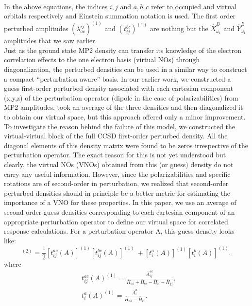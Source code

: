 \\
In the above equations, the indices $i,j$ and $a,b,c$ refer to occupied and virtual orbitals respectively
and Einstein summation notation is used. The first order perturbed amplitudes $(\lambda^{ij}_{ac})^{(1)}$ 
and $(t^{bc}_{ij})^{(1)}$ are nothing but the $\hat{X}^{B}_{\omega_1}$ and $\hat{Y}^{B}_{\omega_1}$ 
amplitudes that we saw earlier.\\ Just as the ground state MP2 density can transfer its knowledge of 
the electron correlation effects to the one electron basis (virtual NOs) through diagonalization, 
the perturbed densities can be used in a similar way to construct a compact ``perturbation aware''
basis. In our earlier work, we constructed a guess first-order perturbed density associated  
with each cartesian component (x,y,z) of the perturbation operator (dipole in the case of polarizabilities)
from MP2 amplitudes, took an average of the three densities and then diagonalized it to obtain our 
virtual space, but this approach offered only a minor improvement\cite{Kumar17}.
To investigate the reason behind the failure of this model, we constructed the virtual-virtual
block of the full CCSD first-order perturbed density. All the diagonal elements of this density 
matrix were found to be zeros irrespective of the perturbation operator. The exact reason for this
is not yet understood but clearly, the virtual NOs (VNOs) obtained from this (or guess) density 
do not carry any useful information. However, since the polarizabilities and specific rotations are 
of second-order in perturbation, we realized that second-order perturbed densities should in principle be a better 
metric for estimating the importance of a VNO for these properties.
In this paper, we use an average of second-order guess densities corresponding to each cartesian
component of an appropriate perturbation operator to define our virtual space 
for correlated response calculations. For a perturbation operator A, this guess density looks like:
\\
\begin{equation}
[{D^A_{ab}}]^{(2)} = \frac{1}{2}[t^{ac}_{ij}(A)]^{(1)}[t^{bc}_{ij}(A)]^{(1)} \
+ [t^{a}_{i}(A)]^{(1)} [t^{b}_{i}(A)]^{(1)}.
\end{equation}
where
\begin{equation}
\begin{split}
& t^{ac}_{ij}(A)^{(1)} = \frac{\bar{A}^{ac}_{ij}}{\overbar{H}_{aa} + \overbar{H}_{cc} - \overbar{H}_{ii} - \overbar{H}_{jj}},\\
& t^{a}_{i}(A)^{(1)} = \frac{\bar{A}^{a}_{i}}{\overbar{H}_{aa} - \overbar{H}_{ii}}.\\
\end{split}
\end{equation}

